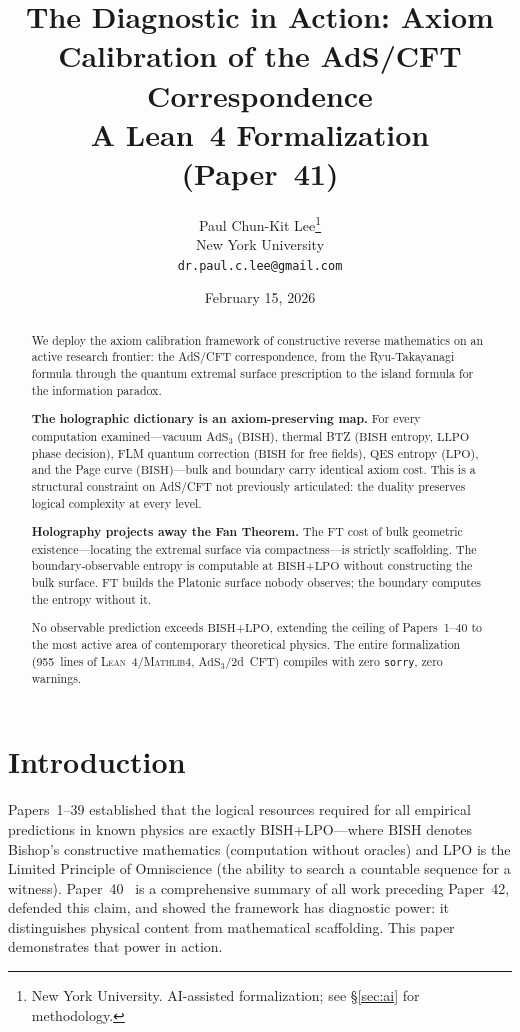 \documentclass[11pt,a4paper]{article}
\title{%
  \textbf{The Diagnostic in Action: Axiom Calibration
  of the AdS/CFT Correspondence}\\[6pt]
  {\normalsize A Lean~4 Formalization (Paper~41)}%
}
\author{
  Paul Chun-Kit Lee\thanks{%
    New York University.
    AI-assisted formalization; see \S\ref{sec:ai} for methodology.} \\
  New York University \\
  \texttt{dr.paul.c.lee@gmail.com}
}
\date{February 15, 2026}
\theoremstyle{plain}
\theoremstyle{definition}
\newcommand{\LPO}{\ensuremath{\mathrm{LPO}}}
\newcommand{\LLPO}{\ensuremath{\mathrm{LLPO}}}
\newcommand{\BISH}{\ensuremath{\mathrm{BISH}}}
\newcommand{\FT}{\ensuremath{\mathrm{FT}}}
\newcommand{\AdS}{\ensuremath{\mathrm{AdS}}}
\newcommand{\QES}{\ensuremath{\mathrm{QES}}}
\newcommand{\Lean}{\textsc{Lean~4}}
\newcommand{\Mathlib}{\textsc{Mathlib4}}
\begin{document}
\maketitle

\begin{abstract}
We deploy the axiom calibration framework of constructive reverse
mathematics on an active research frontier: the AdS/CFT
correspondence, from the Ryu-Takayanagi formula through the
quantum extremal surface prescription to the island formula for the
information paradox.

\medskip\noindent
\textbf{The holographic dictionary is an axiom-preserving map.}
For every computation examined---vacuum $\AdS_3$ ($\BISH$),
thermal BTZ ($\BISH$ entropy, $\LLPO$ phase decision),
FLM quantum correction ($\BISH$ for free fields),
$\QES$ entropy ($\LPO$), and the Page curve ($\BISH$)---bulk and
boundary carry identical axiom cost.  This is a structural
constraint on AdS/CFT not previously articulated: the duality
preserves logical complexity at every level.

\medskip\noindent
\textbf{Holography projects away the Fan Theorem.}
The $\FT$ cost of bulk geometric existence---locating the
extremal surface via compactness---is strictly scaffolding.
The boundary-observable entropy is computable at
$\BISH$+$\LPO$ without constructing the bulk surface.
$\FT$ builds the Platonic surface nobody observes;
the boundary computes the entropy without it.

\medskip\noindent
No observable prediction exceeds $\BISH$+$\LPO$, extending
the ceiling of Papers~1--40 to the most active area of
contemporary theoretical physics.
The entire formalization
(955~lines of \Lean{}/\Mathlib{}, $\AdS_3$/2d~CFT)
compiles with zero \texttt{sorry}, zero warnings.
\end{abstract}

\section{Introduction}\label{sec:intro}

Papers~1--39 established that the logical resources required for all
empirical predictions in known physics are exactly $\BISH$+$\LPO$---where
$\BISH$ denotes Bishop's constructive mathematics (computation without
oracles) and $\LPO$ is the Limited Principle of Omniscience (the
ability to search a countable sequence for a witness).
Paper~40~\cite{Lee26P40} is a comprehensive summary of all work
preceding Paper~42, defended this claim, and showed the framework
has diagnostic power: it distinguishes physical content from
mathematical scaffolding.
This paper demonstrates that power in action.
\end{document}

